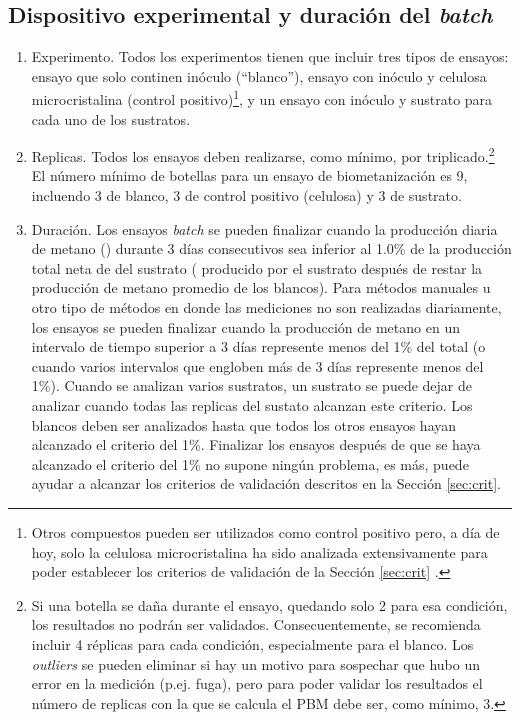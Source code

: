 \documentclass[]{article}
\begin{document}
\subsection{Dispositivo experimental y duración del \emph{batch}}
\label{sec:setup}
\begin{enumerate}
  \item Experimento. 
    Todos los experimentos tienen que incluir tres tipos de ensayos: ensayo que solo continen inóculo (``blanco''), ensayo con inóculo y celulosa microcristalina (control positivo)\footnote{
      Otros compuestos pueden ser utilizados como control positivo pero, a día de hoy, solo la celulosa microcristalina ha sido analizada extensivamente para poder establecer los criterios de validación de la Sección \ref{sec:crit} \citep{hafnerImprovingInterlaboratoryReproducibility2020}.
    }, y un ensayo con inóculo y sustrato para cada uno de los sustratos.
    \item Replicas. 
    Todos los ensayos deben realizarse, como mínimo, por triplicado.\footnote{
      Si una botella se daña durante el ensayo, quedando solo 2 para esa condición, los resultados no podrán ser validados. Consecuentemente, se recomienda incluir 4 réplicas para cada condición, especialmente para el blanco. Los \emph{outliers} se pueden eliminar si hay un motivo para sospechar que hubo un error en la medición (p.ej. fuga), pero para poder validar los resultados el número de replicas con la que se calcula el PBM debe ser, como mínimo, 3.
    }
    El número mínimo de botellas para un ensayo de biometanización es 9, incluendo 3 de blanco, 3 de control positivo (celulosa) y 3 de sustrato.
  \item Duración. 
    Los ensayos \emph{batch} se pueden finalizar cuando la producción diaria de metano () durante 3 días consecutivos sea inferior al 1.0\% de la producción total neta de  del sustrato ( producido por el sustrato después de restar la producción de metano promedio de los blancos). 
    Para métodos manuales u otro tipo de métodos en donde las mediciones no son realizadas diariamente, los ensayos se pueden finalizar cuando la producción de metano en un intervalo de tiempo superior a 3 días represente menos del  1\% del total (o cuando varios intervalos que engloben más de 3 días represente menos del 1\%).
    Cuando se analizan varios sustratos, un sustrato se puede dejar de analizar cuando todas las replicas del sustato alcanzan este criterio.
    Los blancos deben ser analizados hasta que todos los otros ensayos hayan alcanzado el criterio del 1\%.
    Finalizar los ensayos después de que se haya alcanzado el criterio del 1\% no supone ningún problema, es más, puede ayudar a alcanzar los criterios de validación descritos en la Sección \ref{sec:crit}.
\end{enumerate}
\end{document}
